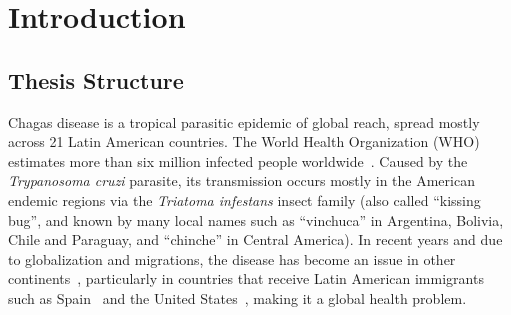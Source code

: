 
\chapter{Introduction}\label{ch:introduction}

\section{Thesis Structure}


Chagas disease is a tropical parasitic epidemic of global reach, spread mostly across 21 Latin American countries. The World Health Organization (WHO) estimates more than six million infected people worldwide~\cite{who2016}. Caused by the \textit{Trypanosoma cruzi} parasite, its transmission occurs mostly in the American endemic regions via the \textit{Triatoma infestans} insect family (also called ``kissing bug'', and known by many local names such as ``vinchuca'' in Argentina, Bolivia, Chile and Paraguay, and ``chinche'' in Central America). In recent years and due to globalization and migrations, the disease has become an %
issue in other continents~\cite{schmunis2010chagas},
particularly in countries that receive Latin American immigrants such as Spain~\cite{navarro2012chagas} and the United States~\cite{hotez2013unfolding},
making it a global health problem.


